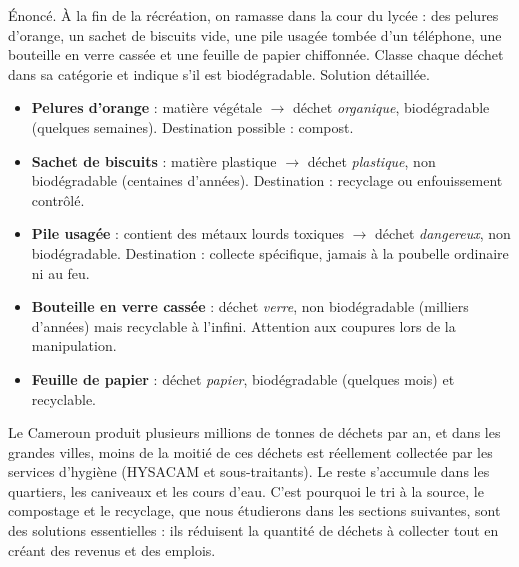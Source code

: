 \documentclass[11pt]{article}
\begin{document}
\begin{exoresolu}
Énoncé. À la fin de la récréation, on ramasse dans la cour du lycée : des pelures d'orange, un sachet de biscuits vide, une pile usagée tombée d'un téléphone, une bouteille en verre cassée et une feuille de papier chiffonnée. Classe chaque déchet dans sa catégorie et indique s'il est biodégradable.
\tcblower
Solution détaillée.
\begin{itemize}
\item \textbf{Pelures d'orange} : matière végétale $\rightarrow$ déchet \emph{organique}, biodégradable (quelques semaines). Destination possible : compost.
\item \textbf{Sachet de biscuits} : matière plastique $\rightarrow$ déchet \emph{plastique}, non biodégradable (centaines d'années). Destination : recyclage ou enfouissement contrôlé.
\item \textbf{Pile usagée} : contient des métaux lourds toxiques $\rightarrow$ déchet \emph{dangereux}, non biodégradable. Destination : collecte spécifique, jamais à la poubelle ordinaire ni au feu.
\item \textbf{Bouteille en verre cassée} : déchet \emph{verre}, non biodégradable (milliers d'années) mais recyclable à l'infini. Attention aux coupures lors de la manipulation.
\item \textbf{Feuille de papier} : déchet \emph{papier}, biodégradable (quelques mois) et recyclable.
\end{itemize}
\end{exoresolu}

\begin{savaistu}
Le Cameroun produit plusieurs millions de tonnes de déchets par an, et dans les grandes villes, moins de la moitié de ces déchets est réellement collectée par les services d'hygiène (HYSACAM et sous-traitants). Le reste s'accumule dans les quartiers, les caniveaux et les cours d'eau. C'est pourquoi le tri à la source, le compostage et le recyclage, que nous étudierons dans les sections suivantes, sont des solutions essentielles : ils réduisent la quantité de déchets à collecter tout en créant des revenus et des emplois.
\end{savaistu}
\end{document}
